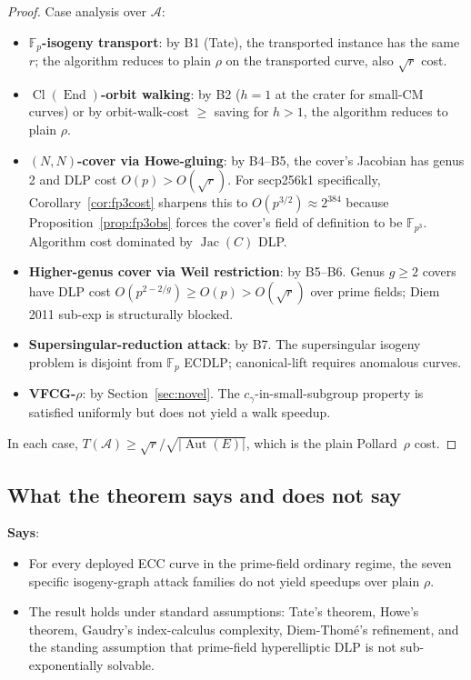 \documentclass[11pt,a4paper]{article}
\theoremstyle{definition}
\newcommand{\FF}{\mathbb{F}}
\newcommand{\End}{\operatorname{End}}
\newcommand{\Aut}{\operatorname{Aut}}
\newcommand{\Cl}{\operatorname{Cl}}
\newcommand{\Jac}{\operatorname{Jac}}
\begin{document}
\begin{proof}
Case analysis over $\mathcal{A}$:
\begin{itemize}
\item \textbf{$\FF_p$-isogeny transport}: by B1 (Tate), the
      transported instance has the same $r$; the algorithm reduces
      to plain $\rho$ on the transported curve, also $\sqrt{r}$ cost.
\item \textbf{$\Cl(\End)$-orbit walking}: by B2 ($h = 1$ at the
      crater for small-CM curves) or by orbit-walk-cost $\geq$ saving
      for $h > 1$, the algorithm reduces to plain $\rho$.
\item \textbf{$(N, N)$-cover via Howe-gluing}: by B4--B5, the
      cover's Jacobian has genus 2 and DLP cost
      $O(p) > O(\sqrt{r})$. For secp256k1 specifically,
      Corollary~\ref{cor:fp3cost} sharpens this to $O(p^{3/2})
      \approx 2^{384}$ because Proposition~\ref{prop:fp3obs}
      forces the cover's field of definition to be $\FF_{p^3}$.
      Algorithm cost dominated by $\Jac(C)$ DLP.
\item \textbf{Higher-genus cover via Weil restriction}: by B5--B6.
      Genus $g \geq 2$ covers have DLP cost
      $O(p^{2 - 2/g}) \geq O(p) > O(\sqrt{r})$ over prime fields;
      Diem 2011 sub-exp is structurally blocked.
\item \textbf{Supersingular-reduction attack}: by B7. The
      supersingular isogeny problem is disjoint from $\FF_p$ ECDLP;
      canonical-lift requires anomalous curves.
\item \textbf{VFCG-$\rho$}: by Section~\ref{sec:novel}. The
      $c_\gamma$-in-small-subgroup property is satisfied uniformly
      but does not yield a walk speedup.
\end{itemize}
In each case, $T(\mathcal{A}) \geq \sqrt{r}/\sqrt{|\Aut(E)|}$, which
is the plain Pollard~$\rho$ cost.
\end{proof}

\subsection*{What the theorem says and does not say}

\textbf{Says}:
\begin{itemize}
\item For every deployed ECC curve in the prime-field ordinary
      regime, the seven specific isogeny-graph attack families do
      not yield speedups over plain $\rho$.
\item The result holds under standard assumptions: Tate's theorem,
      Howe's theorem, Gaudry's index-calculus complexity,
      Diem-Thomé's refinement, and the standing assumption that
      prime-field hyperelliptic DLP is not sub-exponentially solvable.
\end{itemize}
\end{document}
